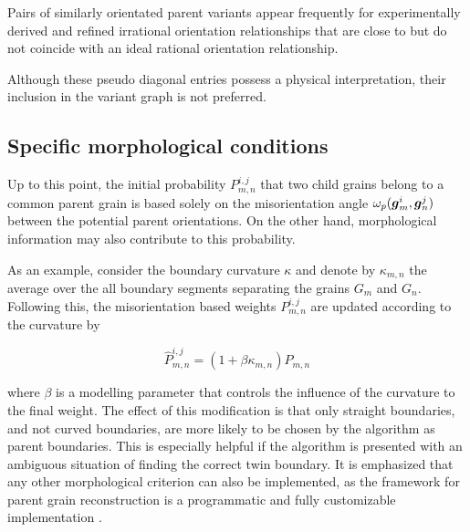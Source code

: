 \documentclass{elsarticle}
\renewcommand{\vec}[1]{\ensuremath \mathbf{\boldsymbol{#1}}}
\numberwithin{equation}{section}
\begin{document}
Pairs of similarly orientated parent variants appear frequently for experimentally derived and refined irrational orientation relationships that are close to but do not coincide with an ideal rational orientation relationship. 

Although these pseudo diagonal entries possess a physical interpretation, their inclusion in the variant graph is not preferred.



\subsection{Specific morphological conditions}
Up to this point, the initial probability $P_{m,n}^{i,j}$ that two child grains belong to a common parent grain is based solely on the misorientation angle $\omega_p(\vec g_m^i, \vec g_n^j)$ between the potential parent orientations. On the other hand, morphological information may also contribute to this probability. 

As an example, consider the boundary curvature $\kappa$ and denote by $\kappa_{m,n}$ the average over the all boundary segments separating the grains $G_m$ and $G_n$. Following this, the misorientation based weights $P_{m,n}^{i,j}$ are updated according to the curvature by 

\begin{equation}
    \hat P_{m,n}^{i,j} 
    = (1+\beta \kappa_{m,n}) P_{m,n}
\end{equation}

where $\beta$ is a modelling parameter that controls the influence of the curvature to the final weight. The effect of this modification is that only straight boundaries, and not curved boundaries, are more likely to be chosen by the algorithm as parent boundaries. This is especially helpful if the algorithm is presented with an ambiguous situation of finding the correct twin boundary. It is emphasized that any other morphological criterion can also be implemented, as the framework for parent grain reconstruction is a programmatic and fully customizable implementation \cite{Niessen2021b}. 
\end{document}

